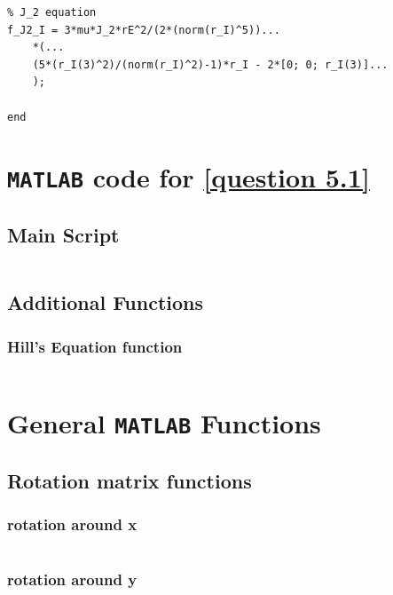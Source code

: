 \documentclass[hidelinks, 12pt]{article}%
\begin{document}
\begin{appendices}
\begin{verbatim}
% J_2 equation
f_J2_I = 3*mu*J_2*rE^2/(2*(norm(r_I)^5))...
    *(...
    (5*(r_I(3)^2)/(norm(r_I)^2)-1)*r_I - 2*[0; 0; r_I(3)]...
    );

end
\end{verbatim}   
                \label{J_2 function for 3.1}

                
\section{\texttt{MATLAB} code for \ref{question 5.1}}
\label{5.1 Appendix}
\subsection{Main Script}
 \inputminted[mathescape=true]{Matlab}{output_files/5.1/CWH.m}
\subsection{Additional Functions}
\subsubsection{Hill's Equation function}
 \inputminted[mathescape=true]{Matlab}{output_files/5.1/CWHdyn.m}






\section{General \texttt{MATLAB} Functions}
\subsection{Rotation matrix functions}
    \label{appendix: rotation matrices}
    \subsubsection{rotation around x}
        \inputminted[]{Matlab}{general code/C_1.m}
\vspace{10pt}
    \subsubsection{rotation around y}
        \inputminted[]{Matlab}{general code/C_2.m}
\vspace{10pt}

\end{appendices}
\end{document}
